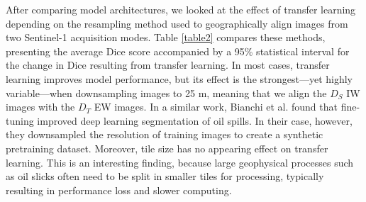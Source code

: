 \documentclass[lettersize,journal]{IEEEtran}
\begin{document}
After comparing model architectures, we looked at the effect of transfer learning depending on the resampling method used to geographically align images from two Sentinel-1 acquisition modes. Table \ref{table2} 
compares these methods, presenting the average Dice score accompanied by a 95\% statistical interval for the change in Dice resulting from transfer learning. In most cases, transfer learning improves 
model performance, but its effect is the strongest—yet highly variable—when downsampling images to 25 m, meaning that we align the $\mathit{D}_S$ IW images with the $\mathit{D}_T$ EW images. 
In a similar work, Bianchi et al. \cite{bianchiLargeScaleDetectionCategorization2020a} found that fine-tuning improved deep learning segmentation of oil spills. 
In their case, however, they downsampled the resolution of training images to create a synthetic pretraining dataset.
Moreover, tile size has no appearing effect on transfer learning. This is an interesting finding, because large geophysical processes such as oil slicks 
often need to be split in smaller tiles for processing, typically resulting in performance loss and slower computing.
\end{document}
